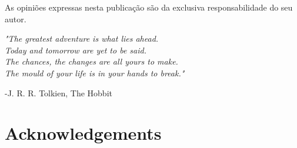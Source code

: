 \documentclass[12pt,a4paper,twoside,openright]{book}
\def\blankpage{%
      \clearpage%
      \thispagestyle{empty}%
      \null%
      \clearpage}
\begin{document}
\begin{sloppy}
\frontmatter


\clearpage \thispagestyle{empty}\mbox{}\clearpage


\clearpage \thispagestyle{empty}\mbox{}\clearpage

\newpage
\thispagestyle{empty}
\vspace*{\fill}
As opiniões expressas nesta publicação são da exclusiva responsabilidade do seu autor.
\blankpage

\newpage
\thispagestyle{empty}
\vspace*{3cm}
\begin{center}
\emph{"The greatest adventure is what lies ahead.\\
Today and tomorrow are yet to be said.\\
The chances, the changes are all yours to make.\\
The mould of your life is in your hands to break."} \\
\end{center} 
\begin{flushright}-J. R. R. Tolkien, The Hobbit\end{flushright}
\clearpage \thispagestyle{empty}\mbox{}\clearpage


\newpage
\thispagestyle{plain}
\chapter*{Acknowledgements}
\clearpage \thispagestyle{empty}\mbox{}\clearpage

\newpage
\thispagestyle{plain}

\end{sloppy}
\end{document}
